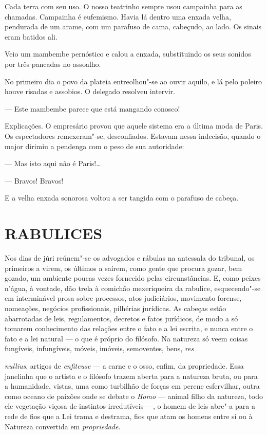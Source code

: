 Cada terra com seu uso. O nosso teatrinho sempre usou campainha para as
chamadas. Campainha é eufemismo. Havia lá dentro uma enxada velha,
pendurada de um arame, com um parafuso de cama, cabeçudo, ao lado. Os
sinais eram batidos ali.

Veio um mambembe pernóstico e calou a enxada, substituindo os seus
sonidos por três pancadas no assoalho.

No primeiro dia o povo da plateia entreolhou"-se ao ouvir aquilo, e lá
pelo poleiro houve risadas e assobios. O delegado resolveu intervir.

--- Este mambembe parece que está mangando conosco!

Explicações. O empresário provou que aquele sistema era a última moda de
Paris. Os espectadores remexeram"-se, desconfiados. Estavam nessa
indecisão, quando o major dirimiu a pendenga com o peso de sua
autoridade:

--- Mas isto aqui não é Paris!\ldots{}

--- Bravos! Bravos!

E a velha enxada sonorosa voltou a ser tangida com o parafuso de cabeça.

\section*{RABULICES}

Nos dias de júri reúnem"-se os advogados e rábulas na antessala do
tribunal, os primeiros a virem, os últimos a saírem, como gente que
procura gozar, bem gozado, um ambiente poucas vezes fornecido pelas
circunstâncias. E, como peixes n'água, à vontade, dão trela à comichão
mexeriqueira da rabulice, esquecendo"-se em interminável prosa sobre
processos, atos judiciários, movimento forense, nomeações, negócios
profissionais, pilhérias jurídicas. As cabeças estão abarrotadas de
leis, regulamentos, decretos e fatos jurídicos, de modo a só tomarem
conhecimento das relações entre o fato e a lei escrita, e nunca entre o
fato e a lei natural --- o que é próprio do filósofo. Na natureza só
veem coisas fungíveis, infungíveis, móveis, imóveis, semoventes, bens,
\emph{res}

\emph{nullius}, artigos de \emph{enfiteuse} --- a carne e o osso, enfim,
da propriedade. Essa janelinha que o artista e o filósofo trazem aberta
para a natureza bruta, ou para a humanidade, vistas, uma como turbilhão
de forças em perene esfervilhar, outra como oceano de paixões onde se
debate o \emph{Homo} --- animal filho da natureza, todo ele vegetação
viçosa de instintos irredutíveis ---, o homem de leis abre"-a para a rede
de fios que a Lei trama e destrama, fios que atam os homens entre si ou
à Natureza convertida em \emph{propriedade}.

